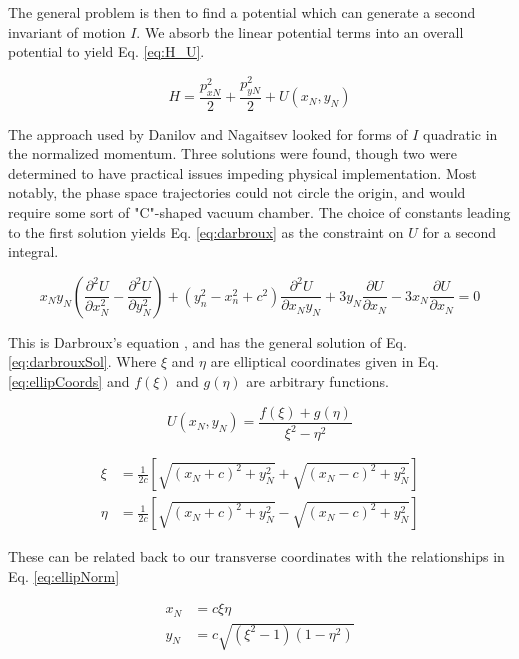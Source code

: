 The general problem is then to find a potential which can generate a second invariant of motion $I$. We absorb the linear potential terms into an overall potential to yield Eq. \ref{eq:H_U}. 

\begin{equation} \label{eq:H_U}
	H = \frac{p_{xN}^2}{2} + \frac{p_{yN}^2}{2} + U(x_N,y_N)
\end{equation}

The approach used by Danilov and Nagaitsev looked for forms of $I$ quadratic in the normalized momentum. Three solutions were found, though two were determined to have practical issues impeding physical implementation. Most notably, the phase space trajectories could not circle the origin, and would require some sort of "C"-shaped vacuum chamber. The choice of constants leading to the first solution yields Eq. \ref{eq:darbroux} as the constraint on $U$ for a second integral.

\begin{equation} \label{eq:darbroux}
	x_N y_N\left( \frac{\partial^2 U}{\partial x_N^2} - \frac{\partial^2 U}{\partial y_N^2}\right) + (y_n^2 - x_n^2 + c^2)\frac{\partial^2 U}{\partial x_N y_N} + 3y_N \frac{\partial U}{\partial x_N} - 3 x_N \frac{\partial U}{\partial x_N} = 0
\end{equation}

This is Darbroux's equation \cite{Darbroux}, and has the general solution of Eq. \ref{eq:darbrouxSol}. Where $\xi$ and $\eta$ are elliptical coordinates given in Eq. \ref{eq:ellipCoords} and $f(\xi)$ and $g(\eta)$ are arbitrary functions.

\begin{equation} \label{eq:darbrouxSol}
	U(x_N,y_N) = \frac{f(\xi) + g(\eta)}{\xi^2 - \eta^2}
\end{equation}

\begin{equation} \label{eq:ellipCoords}
\begin{split}
	\xi &= \frac{1}{2c}\left[ \sqrt{(x_N+c)^2 + y_N^2} + \sqrt{(x_N-c)^2 + y_N^2} \right] \\
	\eta &= \frac{1}{2c}\left[ \sqrt{(x_N+c)^2 + y_N^2} - \sqrt{(x_N-c)^2 + y_N^2} \right]
\end{split}
\end{equation}

These can be related back to our transverse coordinates with the relationships in Eq. \ref{eq:ellipNorm}

\begin{equation} \label{eq:ellipNorm}
\begin{split}
	x_N &= c\xi\eta \\
	y_N &= c \sqrt{(\xi^2-1)(1-\eta^2)}
\end{split}
\end{equation}


